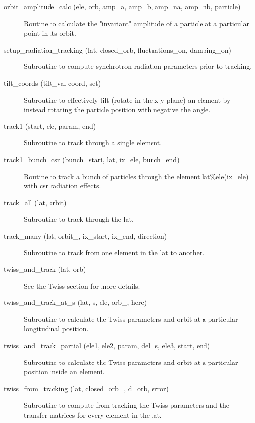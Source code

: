 \begin{description}
\label{r:orbit.amplitude.calc}
\item[orbit_amplitude_calc (ele, orb, amp_a, amp_b, amp_na, amp_nb, particle)] \Newline
Routine to calculate the "invariant" amplitude of a particle at a 
particular point in its orbit. 

\label{r:setup.radiation.tracking}
\item[setup_radiation_tracking (lat, closed_orb, fluctuations_on, damping_on)] \Newline
Subroutine to compute synchrotron radiation parameters prior to tracking. 

\label{r:tilt.coords}
\item[tilt_coords (tilt_val coord, set)] \Newline
Subroutine to effectively tilt (rotate in the x-y plane) an element by 
instead rotating the particle position with negative the angle. 

\label{r:track1}
\item[track1 (start, ele, param, end)] \Newline
Subroutine to track through a single element. 

\label{r:track1.bunch.csr}
\item[track1_bunch_csr (bunch_start, lat, ix_ele, bunch_end)] \Newline 
Routine to track a bunch of particles through the element lat\%ele(ix_ele)
with csr radiation effects.

\label{r:track.all}
\item[track_all (lat, orbit)] \Newline
Subroutine to track through the lat. 

\label{r:track.many}
\item[track_many (lat, orbit_, ix_start, ix_end, direction)] \Newline
Subroutine to track from one element in the lat to another. 

\label{r:twiss.and.track}
\item[twiss_and_track (lat, orb)] \Newline
See the Twiss section for more details. 

\label{r:twiss.and.track.at.s}
\item[twiss_and_track_at_s (lat, s, ele, orb_, here)] \Newline
Subroutine to calculate the Twiss parameters and orbit at a particular longitudinal position. 

\label{r:twiss.and.track.partial}
\item[twiss_and_track_partial (ele1, ele2, param, del_s, ele3, start, end)] \Newline
Subroutine to calculate the Twiss parameters and orbit at a particular position inside an element. 

\label{r:twiss.from.tracking}
\item[twiss_from_tracking (lat, closed_orb_, d_orb, error)] \Newline
Subroutine to compute from tracking the Twiss parameters and the transfer matrices 
for every element in the lat. 

\end{description}


